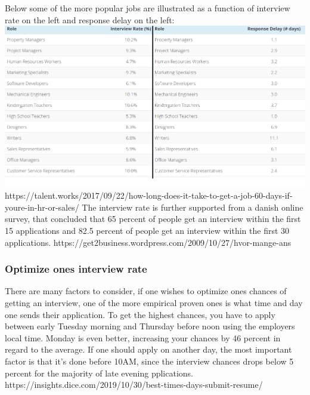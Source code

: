 Below some of the more popular jobs are illustrated as a function of interview
rate on the left and response delay on the left:
\includegraphics{figures/interviewratexdelay.png}
https://talent.works/2017/09/22/how-long-does-it-take-to-get-a-job-60-days-if-youre-in-hr-or-sales/
The interview rate is further supported from a danish online survey, that concluded
that 65 percent of people get an interview within the first 15 applications and
 82.5 percent of people get an interview within the first 30 applications.
 https://get2business.wordpress.com/2009/10/27/hvor-mange-ans%

\subsubsection{Optimize ones interview rate}
There are many factors to consider, if one wishes to optimize ones
chances of getting an interview, one of the more empirical proven ones
is what time and day one sends their application.
To get the highest chances, you have to apply between early Tuesday morning
and Thursday before noon using the employers local time. Monday is even better,
increasing your chances by 46 percent in regard to the average.
If one should apply on another day, the most important factor is that
it's done before 10AM, since the interview chances drops below 5 percent for
the majority of late evening pplications.
https://insights.dice.com/2019/10/30/best-times-days-submit-resume/

